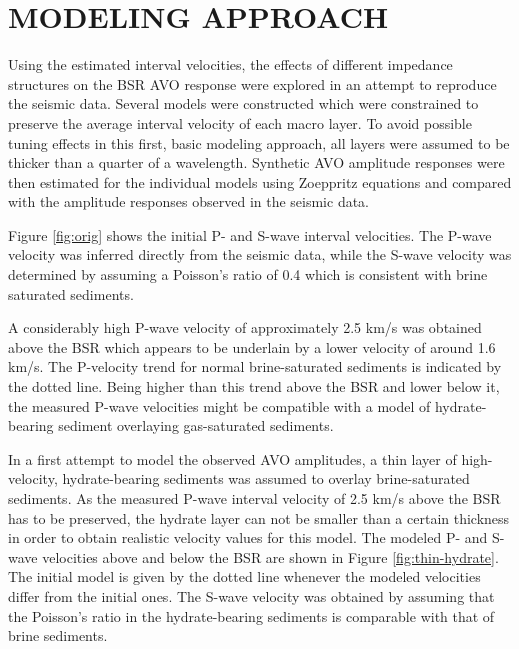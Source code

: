 


\section{MODELING APPROACH}

Using the estimated interval velocities, the effects of different impedance 
structures on the BSR AVO response were explored in an attempt to reproduce the
seismic data. Several models were constructed which were constrained to preserve
the average interval velocity of each macro layer. To avoid possible tuning
effects in this first, basic modeling approach, 
all layers were assumed to be thicker than a quarter of a wavelength.
Synthetic AVO amplitude responses were then estimated for the individual models
using Zoeppritz equations and compared with the amplitude responses observed
in the seismic data. 
\par
Figure \ref{fig:orig} shows the initial P- and S-wave interval 
velocities. The P-wave 
velocity was inferred directly from the seismic data, while the S-wave velocity
was determined by assuming a Poisson's ratio of 0.4 which is consistent with
brine saturated sediments.

\notinteractive
{}

A considerably high P-wave velocity of approximately 2.5 km/s
was obtained above the BSR which appears
to be underlain by a lower velocity of around 1.6 km/s.
The P-velocity trend for normal
brine-saturated sediments is indicated by the dotted line. Being 
higher than this trend above the BSR and lower below it, the measured P-wave
velocities might be compatible with a model of hydrate-bearing sediment 
overlaying gas-saturated sediments.
\par
In a first attempt to model the observed AVO amplitudes, a thin layer of 
high-velocity, hydrate-bearing sediments was assumed to overlay brine-saturated
sediments. As the measured P-wave interval velocity of 2.5 km/s above the BSR 
has to be preserved, the hydrate layer can not be smaller than a certain
thickness in
order to obtain realistic velocity values for this model. The modeled P- and
S-wave velocities above and below the BSR are shown in Figure 
\ref{fig:thin-hydrate}. The initial model is given by the dotted line whenever the
modeled velocities differ from the initial ones.
The S-wave velocity was obtained by assuming that the Poisson's ratio in the
hydrate-bearing sediments is comparable with that of brine sediments.

